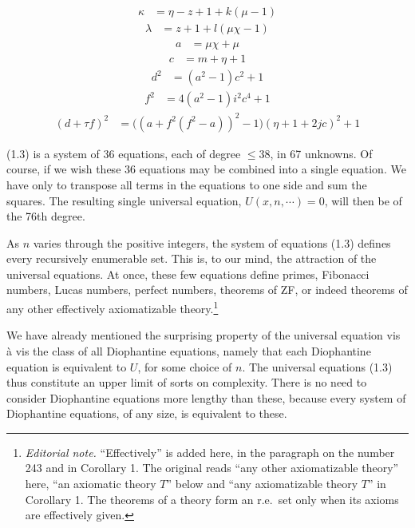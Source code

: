 \documentclass[11pt,a4paper]{article}
\newcommand{\origpage}[1]{\marginnote{\footnotesize\textbf{[#1]}}}
\newcommand{\ednote}[1]{\footnote{\textit{Editorial note.} #1}}
\begin{document}
\begin{align}
\kappa&=\eta-z+1+k(\mu-1) \tag{1.3.30}\label{sys:30}
\end{align}
\begin{align}
\lambda&=z+1+l(\mu\chi-1) \tag{1.3.31}\label{sys:31}
\end{align}
\begin{align}
a&=\mu\chi+\mu \tag{1.3.32}\label{sys:32}
\end{align}
\begin{align}
c&=m+\eta+1 \tag{1.3.33}\label{sys:33}
\end{align}
\begin{align}
d^2&=(a^2-1)c^2+1 \tag{1.3.34}\label{sys:34}
\end{align}
\begin{align}
f^2&=4(a^2-1)i^2c^4+1 \tag{1.3.35}\label{sys:35}
\end{align}
\begin{align}
(d+\tau f)^2&=\bigl((a+f^2(f^2-a))^2-1\bigr)(\eta+1+2jc)^2+1 \tag{1.3.36}\label{sys:36}
\end{align}

\origpage{338}(1.3) is a system of 36 equations, each of degree $\leq 38$, in 67 unknowns. Of course, if we wish these 36 equations may be combined into a single equation. We have only to transpose all terms in the equations to one side and sum the squares. The resulting single universal equation, $U(x, n, \cdots)=0$, will then be of the 76th degree.

As $n$ varies through the positive integers, the system of equations (1.3) defines every recursively enumerable set. This is, to our mind, the attraction of the universal equations. At once, these few equations define primes, Fibonacci numbers, Lucas numbers, perfect numbers, theorems of ZF, or indeed theorems of any other effectively axiomatizable theory.\ednote{``Effectively'' is added here, in the paragraph on the number 243 and in Corollary 1. The original reads ``any other axiomatizable theory'' here, ``an axiomatic theory $T$'' below and ``any axiomatizable theory $T$'' in Corollary 1. The theorems of a theory form an r.e.\ set only when its axioms are effectively given.}

We have already mentioned the surprising property of the universal equation vis à vis the class of all Diophantine equations, namely that each Diophantine equation is equivalent to $U$, for some choice of $n$. The universal equations (1.3) thus constitute an upper limit of sorts on complexity. There is no need to consider Diophantine equations more lengthy than these, because every system of Diophantine equations, of any size, is equivalent to these.
\end{document}
